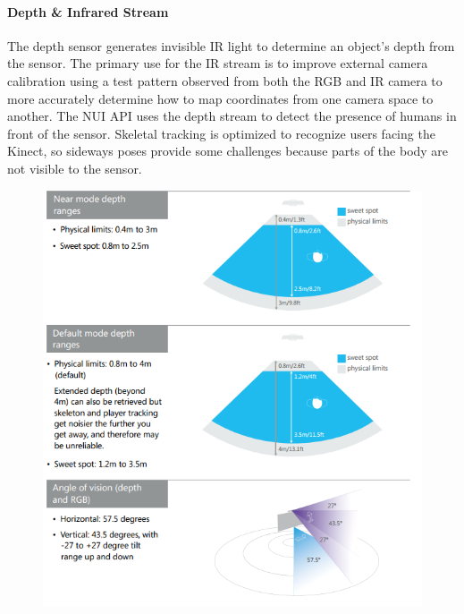 \paragraph{Depth \& Infrared Stream}
The depth sensor generates invisible IR light to determine an object's depth from the sensor. The primary use for the IR stream is to improve external camera calibration using a test pattern observed from both the RGB and IR camera to more accurately determine how to map coordinates from one camera space to another. \cite{irstream} The NUI API uses the depth stream to detect the presence of humans in front of the sensor.\cite{winSDK} Skeletal tracking is optimized to recognize users facing the Kinect, so sideways poses provide some challenges because parts of the body are not visible to the sensor.

\begin{figure}[h]
    \centering
    \includegraphics[height=0.55\textheight]{fig02/kinDepth}
    \label{fig:kinsdepth}
\end{figure}



